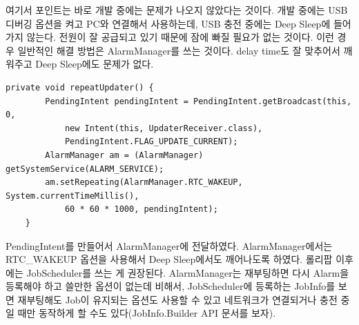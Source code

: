 여기서 포인트는 바로 개발 중에는 문제가 나오지 않았다는 것이다.
개발 중에는 USB 디버깅 옵션을 켜고 PC와 연결해서 사용하는데, USB 충전 중에는 Deep Sleep에 들어가지 않는다. 
전원이 잘 공급되고 있기 때문에 잠에 빠질 필요가 없는 것이다.
이런 경우 일반적인 해결 방법은 AlarmManager를 쓰는 것이다. delay time도 잘 맞추어서 깨워주고 Deep Sleep에도 문제가 없다.
\begin{lstlisting}[frame=single]
	private void repeatUpdater() {
		PendingIntent pendingIntent = PendingIntent.getBroadcast(this, 0, 
			new Intent(this, UpdaterReceiver.class), 
			PendingIntent.FLAG_UPDATE_CURRENT);
		AlarmManager am = (AlarmManager) getSystemService(ALARM_SERVICE);
		am.setRepeating(AlarmManager.RTC_WAKEUP, System.currentTimeMillis(), 
			60 * 60 * 1000, pendingIntent);
	}
\end{lstlisting}
PendingIntent를 만들어서 AlarmManager에 전달하였다. AlarmManager에서는 RTC\_WAKEUP 옵션을 사용해서 Deep Sleep에서도 깨어나도록 하였다. 
롤리팝 이후에는 JobScheduler를 쓰는 게 권장된다. AlarmManager는 재부팅하면 다시 Alarm을 등록해야 하고 쓸만한 옵션이 없는데 비해서, JobScheduler에 등록하는 JobInfo를 보면 재부팅해도 Job이 유지되는 옵션도 사용할 수 있고 네트워크가 연결되거나 충전 중일 때만 동작하게 할 수도 있다(JobInfo.Builder API 문서를 보자).\\

